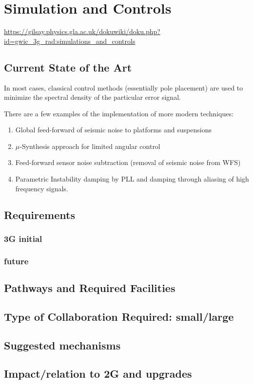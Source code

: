 \section{Simulation and Controls}
\label{sec:SimControls}

\url{https://gilsay.physics.gla.ac.uk/dokuwiki/doku.php?id=gwic_3g_rad:simulations_and_controls}

\subsection{Current State of the Art}
In most cases, classical control methods (essentially pole placement) are used to minimize the spectral density of the particular error signal.

There are a few examples of the implementation of more modern techniques:
\begin{enumerate}
\item Global feed-forward of seismic noise to platforms and suspensions

\item $\mu$-Synthesis approach for limited angular control

\item Feed-forward sensor noise subtraction (removal of seismic noise from WFS)

\item Parametric Instability damping by PLL and damping through aliasing of high frequency signals.


\end{enumerate}

\subsection{Requirements}
\subsubsection{3G initial}
\subsubsection{future}

\subsection{Pathways and Required Facilities}

\subsection{Type of Collaboration Required:  small/large}

\subsection{Suggested mechanisms}

\subsection{Impact/relation to 2G and upgrades}
